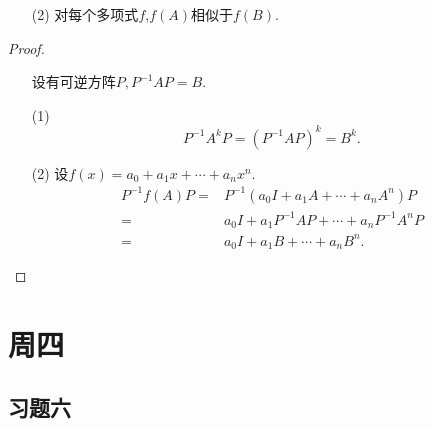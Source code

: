 \documentclass{article}
\begin{document}
\begin{enumerate}
\begin{enumerate}
        \item [(2)]对每个多项式$f$,$f(A)$相似于$f(B)$.
    \end{enumerate}
    \begin{proof}
        \begin{enumerate}
            \item []设有可逆方阵$P,P^{-1} A P=B$.
            \item [(1)]
            \[ 
                P^{-1} A^{k} P={(P^{-1}A P)}^{k}=B^{k}.
            \]
            \item [(2)]设$f(x)=a_0+a_1 x+\cdots+a_n x^n$.
            \begin{align*}
                P^{-1} f(A) P
                =&P^{-1} (a_0 I+a_1 A +\cdots +a_n A^n) P\\
                =&a_0 I+a_1 P^{-1} A P+\cdots +a_n P^{-1} A^n P\\
                =& a_0 I+a_1 B +\cdots +a_n B^n.
            \end{align*}
        \end{enumerate}
    \end{proof}
\end{enumerate}
\section{周四}
\subsection{习题六}
\end{document}
